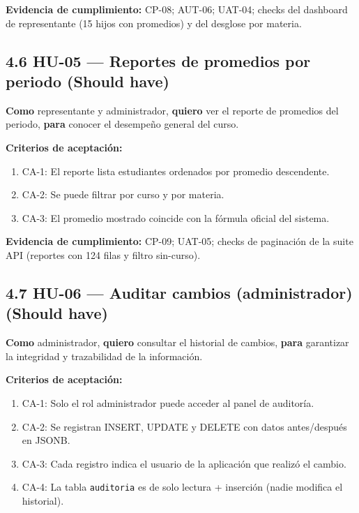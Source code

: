 \documentclass[11pt,a4paper]{article}
\begin{document}
\textbf{Evidencia de cumplimiento:} CP-08; AUT-06; UAT-04; checks del dashboard de representante (15 hijos con promedios) y del desglose por materia.


\subsection*{4.6 HU-05 --- Reportes de promedios por periodo \textbf{(Should have)}}


\textbf{Como} representante y administrador, \textbf{quiero} ver el reporte de promedios del periodo, \textbf{para} conocer el desempeño general del curso.


\textbf{Criterios de aceptación:}


\begin{enumerate}[leftmargin=*]
\item CA-1: El reporte lista estudiantes ordenados por promedio descendente.
\item CA-2: Se puede filtrar por curso y por materia.
\item CA-3: El promedio mostrado coincide con la fórmula oficial del sistema.
\end{enumerate}


\textbf{Evidencia de cumplimiento:} CP-09; UAT-05; checks de paginación de la suite API (reportes con 124 filas y filtro sin-curso).


\subsection*{4.7 HU-06 --- Auditar cambios (administrador) \textbf{(Should have)}}


\textbf{Como} administrador, \textbf{quiero} consultar el historial de cambios, \textbf{para} garantizar la integridad y trazabilidad de la información.


\textbf{Criterios de aceptación:}


\begin{enumerate}[leftmargin=*]
\item CA-1: Solo el rol administrador puede acceder al panel de auditoría.
\item CA-2: Se registran INSERT, UPDATE y DELETE con datos antes/después en JSONB.
\item CA-3: Cada registro indica el usuario de la aplicación que realizó el cambio.
\item CA-4: La tabla \texttt{auditoria} es de solo lectura + inserción (nadie modifica el historial).
\end{enumerate}
\end{document}
